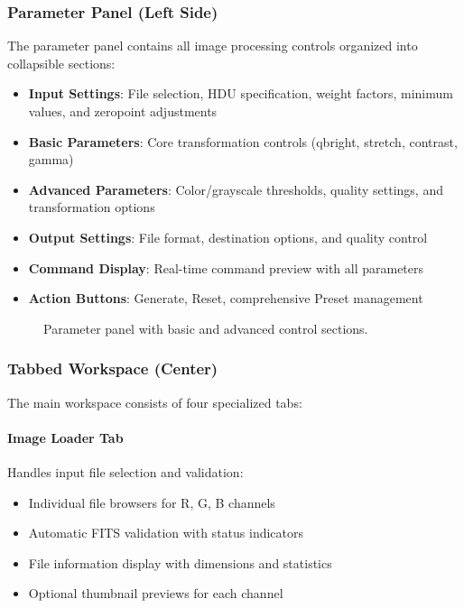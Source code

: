 \documentclass[11pt,a4paper]{article}
\begin{document}
\subsubsection{Parameter Panel (Left Side)}

The parameter panel contains all image processing controls organized into
collapsible sections:

\begin{itemize}[leftmargin=*]
\item \textbf{Input Settings}: File selection, HDU specification, weight 
factors, minimum values, and zeropoint adjustments
\item \textbf{Basic Parameters}: Core transformation controls (qbright,
stretch, contrast, gamma)
\item \textbf{Advanced Parameters}: Color/grayscale thresholds, quality
settings, and transformation options
\item \textbf{Output Settings}: File format, destination options, and
quality control
\item \textbf{Command Display}: Real-time command preview with all
parameters
\item \textbf{Action Buttons}: Generate, Reset, comprehensive Preset
management
\end{itemize}

\begin{figure}[H]
\centering
\caption{Parameter panel with basic and advanced control sections.}
\label{fig:parameter-panel}
\end{figure}

\subsubsection{Tabbed Workspace (Center)}

The main workspace consists of four specialized tabs:

\paragraph{Image Loader Tab}
Handles input file selection and validation:
\begin{itemize}[leftmargin=*]
\item Individual file browsers for R, G, B channels
\item Automatic FITS validation with status indicators
\item File information display with dimensions and statistics
\item Optional thumbnail previews for each channel
\end{itemize}
\end{document}
